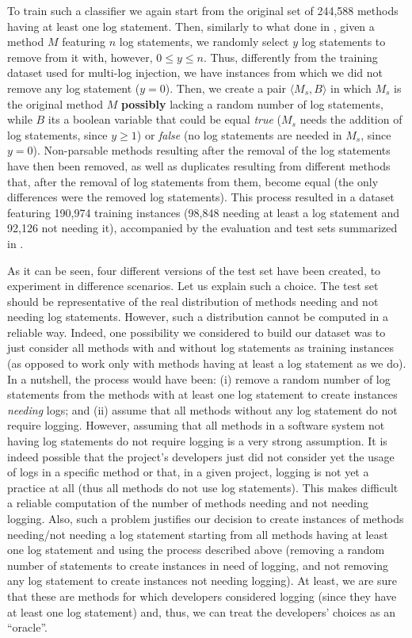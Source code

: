To train such a classifier we again start from the original set of 244,588 \java methods having at least one log statement. Then, similarly to what done in , given a method $M$ featuring $n$ log statements, we randomly select $y$ log statements to remove from it with, however, $0 \leq y \leq n$. Thus, differently from the training dataset used for multi-log injection, we have instances from which we did not remove any log statement ($y=0$). Then, we create a pair $\langle M_s, B \rangle$ in which $M_s$ is the original method $M$ \textbf{possibly} lacking a random number of log statements, while $B$ its a boolean variable that could be equal \emph{true} (\ie $M_s$ needs the addition of log statements, since $y \geq 1$) or \emph{false} (\ie no log statements are needed in $M_s$, since $y = 0$). Non-parsable methods resulting after the removal of the log statements have then been removed, as well as duplicates resulting from different methods that, after the removal of log statements from them, become equal (\ie the only differences were the removed log statements). This process resulted in a dataset featuring 190,974 training instances (98,848 needing at least a log statement and 92,126 not needing it), accompanied by the evaluation and test sets summarized in .

As it can be seen, four different versions of the test set have been created, to experiment \approach in difference scenarios. Let us explain such a choice. The test set should be representative of the real distribution of \java methods needing and not needing log statements. However, such a distribution cannot be computed in a reliable way. Indeed, one possibility we considered to build our dataset was to just consider all methods with and without log statements as training instances (as opposed to work only with methods having at least a log statement as we do). In a nutshell, the process would have been: (i) remove a random number of log statements from the methods with at least one log statement to create instances \emph{needing} logs; and (ii) assume that all methods without any log statement do not require logging. However, assuming that all methods in a software system not having log statements do not require logging is a very strong assumption. It is indeed possible that the project's developers just did not consider yet the usage of logs in a specific method or that, in a given project, logging is not yet a practice at all (thus all methods do not use log statements). This makes difficult a reliable computation of the number of methods needing and not needing logging. Also, such a problem justifies our decision to create  instances of methods needing/not needing a log statement starting from all methods having at least one log statement and using the process described above (\ie removing a random number of statements to create instances in need of logging, and not removing any log statement to create instances not needing logging). At least, we are sure that these are methods for which developers considered logging (since they have at least one log statement) and, thus, we can treat the developers' choices as an ``oracle''. 


